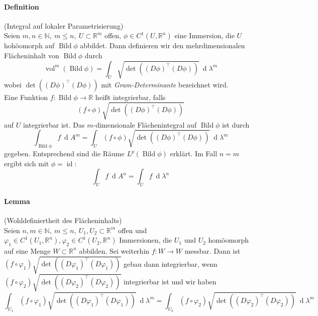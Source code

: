 \documentclass[12pt,a4paper,fleqn]{article}
\def\R{{\mathbb{R}}}
\def\d{{\operatorname{d}}}
\begin{document}
\paragraph{Definition} (Integral auf lokaler Parametrisierung)\\
Seien $m, n \in \mathbb{N},\ m \leq n,\ U \subset \R^m$ offen, $\phi \in C^1(U, \R^n)$ eine Immersion, die $U$ hohöomorph auf $\operatorname{Bild} \phi$ abbildet. Dann definieren wir den mehrdimensionalen Flächeninhalt von $\operatorname{Bild} \phi$ durch
\begin{displaymath}
\operatorname{vol}^m(\operatorname{Bild} \phi) = \int_U \sqrt{\det((D\phi)^\top(D\phi))}\ \d\lambda^m
\end{displaymath}
wobei $\det ((D\phi)^\top(D\phi))$ mit \textit{Gram-Determinante} bezeichnet wird.\\
 Eine Funktion $f\colon \operatorname{Bild} \phi \rightarrow \R$ heißt integrierbar, falls
 \begin{displaymath}
 (f \circ \phi)\sqrt{\det((D\phi)^\top(D\phi))}
 \end{displaymath}
 auf $U$ integrierbar ist. Das $m$-dimensionale Flächenintegral auf $\operatorname{Bild}\phi$ ist durch 
 \begin{displaymath}
 \int_{\operatorname{Bild} \phi} f\ \d A^m = \int_U (f \circ \phi)\sqrt{\det((D\phi)^\top(D\phi))}\ \d\lambda^m
 \end{displaymath}
 gegeben. Entsprechend sind die Räume $L^p(\operatorname{Bild}\phi)$ erklärt.
 Im Fall $n = m$ ergibt sich mit $\phi = \operatorname{id}$:
 \begin{displaymath}
 \int_U f\ \d A^n = \int_U f\ \d\lambda^n
 \end{displaymath}
 
 \paragraph{Lemma} (Wohldefiniertheit des Flächeninhalts)\\
 Seien $n, m \in \mathbb{N},\ m \leq n,\ U_1, U_2 \subset \R^m$ offen und $\varphi_1 \in C^1(U_1, \R^n), \varphi_2 \in C^1(U_2, \R^n)$ Immersionen, die $U_1$ und $U_2$ homöomorph auf eine Menge $W\subset \R^n$ abbilden. Sei weiterhin $f\colon W \rightarrow W$ messbar. Dann ist $(f \circ \varphi_1)\sqrt{\det((D\varphi_1)^\top(D\varphi_1))}$ gebau dann integrierbar, wenn $(f \circ \varphi_2)\sqrt{\det((D\varphi_2)^\top(D\varphi_2))}$ integrierbar ist und wir haben
 \begin{displaymath}
 \int_{U_1} (f \circ \varphi_1)\sqrt{\det((D\varphi_1)^\top(D\varphi_1))}\ \d\lambda^m = \int_{U_2} (f \circ \varphi_2)\sqrt{\det((D\varphi_2)^\top(D\varphi_2))}\ \d\lambda^m
 \end{displaymath}
 
\end{document}
